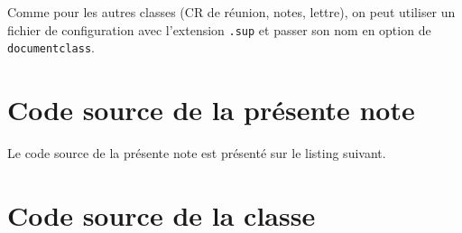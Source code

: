 \documentclass[fr]{supaero-note-cf}
\begin{document}
Comme pour les autres classes (CR de réunion, notes, lettre), on
peut utiliser un fichier de configuration avec l'extension
\texttt{.sup} et passer son nom en option de \texttt{documentclass}.

\section{Code source de la présente note}
\label{sec:code-source}

Le code source de la présente note est présenté sur le listing
suivant.



\section{Code source de la classe}
\label{sec:code-source-supaero-note(cf)}


\end{document}
